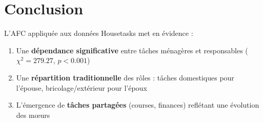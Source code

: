 \documentclass[12pt,a4paper]{article}
\begin{document}
\section{Conclusion}

L'AFC appliquée aux données Housetasks met en évidence :
\begin{enumerate}
    \item Une \textbf{dépendance significative} entre tâches ménagères et responsables ($\chi^2 = 279.27$, $p < 0.001$)
    \item Une \textbf{répartition traditionnelle} des rôles : tâches domestiques pour l'épouse, bricolage/extérieur pour l'époux
    \item L'émergence de \textbf{tâches partagées} (courses, finances) reflétant une évolution des mœurs
\end{enumerate}
\end{document}

